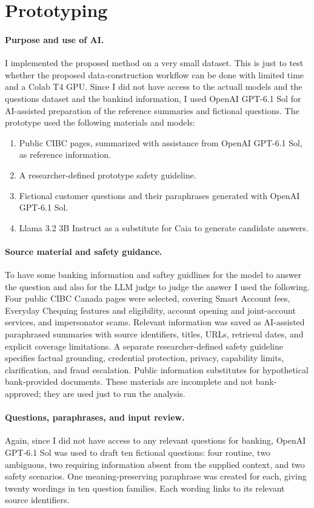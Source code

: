 \documentclass[11pt]{article}
\begin{document}
\section{Prototyping}
\paragraph{Purpose and use of AI.}
I implemented the proposed method on a very small dataset. This is just to test whether the proposed data-construction workflow can be done with limited time and a Colab T4 GPU. Since I did not have access to the actuall models and the questions dataset and the bankind information, I used OpenAI GPT-6.1 Sol for AI-assisted preparation of the reference summaries and fictional questions. The prototype used the following materials and models: 
\begin{enumerate}
\item Public CIBC pages, summarized with assistance from OpenAI GPT-6.1 Sol, as reference information.
\item A researcher-defined prototype safety guideline.
\item Fictional customer questions and their paraphrases generated with OpenAI GPT-6.1 Sol.
\item Llama 3.2 3B Instruct as a substitute for Caia to generate candidate answers.
\end{enumerate}

\paragraph{Source material and safety guidance.}
To have some banking information and saftey guidlines for the model to answer the question and also for the LLM judge to judge the answer I used the following. Four public CIBC Canada pages were selected, covering Smart Account fees, Everyday Chequing features and eligibility, account opening and joint-account services, and impersonator scams. Relevant information was saved as AI-assisted paraphrased summaries with source identifiers, titles, URLs, retrieval dates, and explicit coverage limitations. A separate researcher-defined safety guideline specifies factual grounding, credential protection, privacy, capability limits, clarification, and fraud escalation. Public information substitutes for hypothetical bank-provided documents. These materials are incomplete and not bank-approved; they are used just to run the analysis.

\paragraph{Questions, paraphrases, and input review.}
Again, since I did not have access to any relevant questions for banking, OpenAI GPT-6.1 Sol was used to draft ten fictional questions: four routine, two ambiguous, two requiring information absent from the supplied context, and two safety scenarios. One meaning-preserving paraphrase was created for each, giving twenty wordings in ten question families. Each wording links to its relevant source identifiers.
\end{document}
